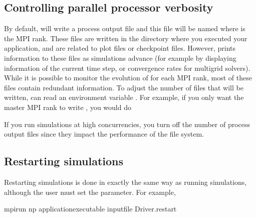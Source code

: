 \documentclass[letterpaper,10pt,english]{sphinxmanual}
\begin{document}
\subsection{Controlling parallel processor verbosity}
\label{\detokenize{Base/Control:controlling-parallel-processor-verbosity}}
By default,  will write a process output file  and this file will be named  where  is the MPI rank.
These files are written in the directory where you executed your application, and are  related to plot files or checkpoint files.
However,  prints information to these files as simulations advance (for example by displaying information of the current time step, or convergence rates for multigrid solvers).
While it is possible to monitor the evolution of  for each MPI rank, most of these files contain redundant information.
To adjust the number of files that will be written,  can read an environment variable .
For example, if you only want the master MPI rank to write , you would do

\begin{sphinxVerbatim}[commandchars=\\\{\},formatcom=\scriptsize]
 
\end{sphinxVerbatim}

If you run simulations at high concurrencies, you  turn off the number of process output files since they impact the performance of the file system.


\subsection{Restarting simulations}
\label{\detokenize{Base/Control:restarting-simulations}}\label{\detokenize{Base/Control:chap-restartingsimulations}}
Restarting simulations is done in exactly the same way as running simulations, although the user must set the  parameter.
For example,

\begin{sphinxVerbatim}[commandchars=\\\{\},formatcom=\scriptsize]
mpirun \PYGZhy{}np  \PYGZlt{}application\PYGZus{}executable\PYGZgt{} \PYGZlt{}input\PYGZus{}file\PYGZgt{} Driver.restart
\end{sphinxVerbatim}
\end{document}
